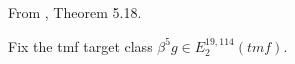 \begin{definition}
\label{frontier:Literature:b9dce73bafd4}
From \cite{BR21}, Theorem 5.18.\par

Fix the tmf target class $\beta^5g\in E_2^{19,114}(\mathit{tmf})$.
\end{definition}

